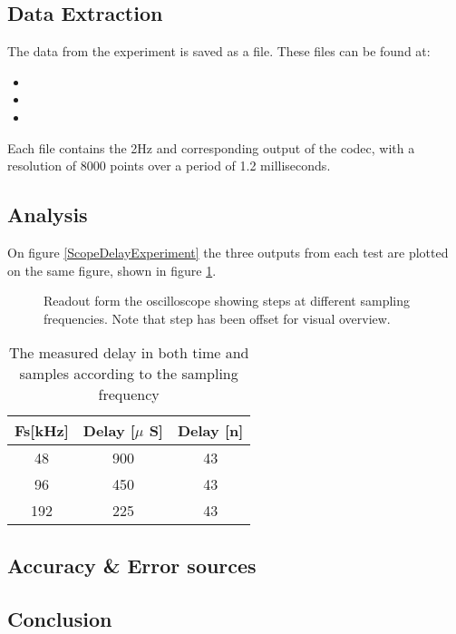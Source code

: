 \subsection{Data Extraction}

The data from the experiment is saved as a  file. These files can be found at:
\begin{itemize}
	\item {}
	\item {}
	\item {}
\end{itemize}

Each file contains the 2Hz and corresponding output of the codec, with a resolution of 8000 points over a period of 1.2 milliseconds.


\subsection{Analysis}

On figure \ref{ScopeDelayExperiment} the three outputs from each test are plotted on the same figure, shown in figure \ref{fig:ScopeDelayExperiment}.  

\begin{figure}[H]
	\centering
	
	\caption{Readout form the oscilloscope showing steps at different sampling frequencies. Note that step has been offset for visual overview.}
	\label{fig:ScopeDelayExperiment}
\end{figure}


\begin{table}[H]
	\centering
	\begin{tabular}{ccc}
		Fs[kHz] & Delay [$\mu$ S] & Delay [n] \\ \hline \hline
		48 & 900 & 43 \\ 
		96 & 450 & 43 \\ 
		192 & 225 & 43
	\end{tabular} 
	\caption{The measured delay in both time and samples according to the sampling frequency}
	\label{tab:DelayResults}
\end{table}


\subsection{Accuracy \& Error sources}

\subsection{Conclusion}





